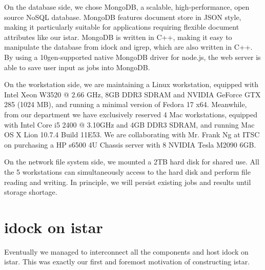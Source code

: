 On the database side, we chose MongoDB, a scalable, high-performance, open source NoSQL database. MongoDB features document store in JSON style, making it particularly suitable for applications requiring flexible document attributes like our istar. MongoDB is written in C++, making it easy to manipulate the database from idock and igrep, which are also written in C++. By using a 10gen-supported native MongoDB driver for node.js, the web server is able to save user input as jobs into MongoDB.

On the workstation side, we are maintaining a Linux workstation, equipped with Intel Xeon W3520 @ 2.66 GHz, 8GB DDR3 SDRAM and NVIDIA GeForce GTX 285 (1024 MB), and running a minimal version of Fedora 17 x64. Meanwhile, from our department we have exclusively reserved 4 Mac workstations, equipped with Intel Core i5 2400 @ 3.10GHz and 4GB DDR3 SDRAM, and running Mac OS X Lion 10.7.4 Build 11E53. We are collaborating with Mr. Frank Ng at ITSC on purchasing a HP s6500 4U Chassis server with 8 NVIDIA Tesla M2090 6GB.

On the network file system side, we mounted a 2TB hard disk for shared use. All the 5 workstations can simultaneously access to the hard disk and perform file reading and writing. In principle, we will persist existing jobs and results until storage shortage.

\section{idock on istar}

Eventually we managed to interconnect all the components and host idock \citep{1153} on istar. This was exactly our first and foremost motivation of constructing istar.

